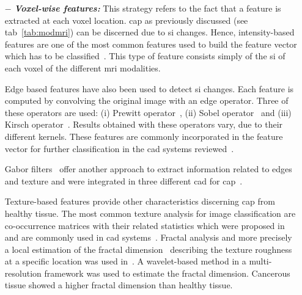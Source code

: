 \begin{enumerate}[leftmargin=*]

\item[$-$] \textbf{\textit{Voxel-wise features:}} This strategy refers to the fact that a feature is extracted at each voxel location. \ac{cap} as previously discussed (see \ac{tab}~\ref{tab:modmri}) can be discerned due to \ac{si} changes. Hence, intensity-based features are one of the most common features used to build the feature vector which has to be classified~\cite{Ampeliotis2007,Ampeliotis2008,Artan2009,Artan2010,Chan2003,Langer2009,Litjens2011,Litjens2012,Litjens2014,Liu2009,Niaf2011,Niaf2012,Viswanath2008a,Viswanath2011}. This type of feature consists simply of the \ac{si} of each voxel of the different \ac{mri} modalities.

Edge based features have also been used to detect \Ac{si} changes. Each feature is computed by convolving the original image with an edge operator. Three of these operators are used: (i) Prewitt operator~\cite{Prewitt1970}, (ii) Sobel operator~\cite{Sobel1970} and (iii) Kirsch operator~\cite{Kirsch1971}. Results obtained with these operators vary, due to their different kernels. These features are commonly incorporated in the feature vector for further classification in the \ac{cad} systems reviewed~\cite{Niaf2011,Niaf2012,Tiwari2009a,Tiwari2010,Tiwari2013,Viswanath2008,Viswanath2011}.

  Gabor filters~\cite{Gabor1946,Daugman1985} offer another approach to extract information related to edges and texture and were integrated in three different \ac{cad} for \ac{cap}~\cite{Viswanath2008,Viswanath2012,Tiwari2012}.
  
  Texture-based features provide other characteristics discerning \ac{cap} from healthy tissue. The most common texture analysis for image classification are co-occurrence matrices with their related statistics which were proposed in~\cite{Haralick1973} and are commonly used in \ac{cad} systems~\cite{Antic2013,Niaf2011,Niaf2012,Tiwari2009a,Tiwari2010,Tiwari2013,Viswanath2008,Viswanath2008a,Viswanath2011,Viswanath2012}.
  Fractal analysis and more precisely a local estimation of the fractal dimension~\cite{Benassi1998} describing the texture roughness at a specific location was used in~\cite{Lopes2011}. A wavelet-based method in a multi-resolution framework was used to estimate the fractal dimension. Cancerous tissue showed a higher fractal dimension than healthy tissue.


\end{enumerate}
